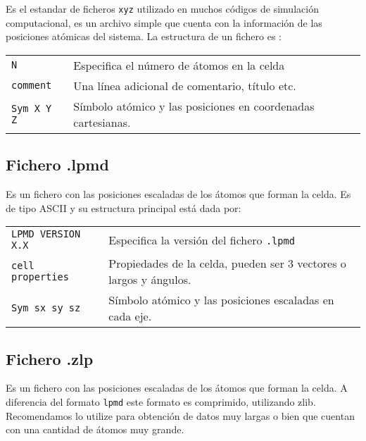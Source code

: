 \documentclass[a4paper,10pt]{scrbook}
\begin{document}
Es el estandar de ficheros \verb|xyz| utilizado en muchos c\'odigos de simulaci\'on computacional, es un archivo simple que cuenta con la informaci\'on de las posiciones at\'omicas del sistema. La estructura de un fichero es :
\begin{center}
\begin{tabular}{l|l}
 \verb|N| & Especifica el n\'umero de \'atomos en la celda \\
 \verb|comment| & Una l\'inea adicional de comentario, t\'itulo etc. \\
 \verb|Sym X Y Z| & S\'imbolo at\'omico y las posiciones en coordenadas cartesianas. \\
\end{tabular}
\end{center}

\subsection{Fichero .lpmd}

Es un fichero con las posiciones escaladas de los \'atomos que forman la celda. Es de tipo ASCII y su estructura principal est\'a dada por:

\begin{center}
 \begin{tabular}{l|l}
 \verb|LPMD VERSION X.X | & Especifica la versi\'on del fichero \verb|.lpmd| \\
 \verb|cell properties | & Propiedades de la celda, pueden ser 3 vectores o largos y \'angulos. \\
 \verb|Sym sx sy sz| & S\'imbolo at\'omico y las posiciones escaladas en cada eje.\\
\end{tabular}
\end{center}

\subsection{Fichero .zlp}

Es un fichero con las posiciones escaladas de los \'atomos que forman la celda. A diferencia del formato \verb|lpmd| este formato es comprimido, utilizando zlib. Recomendamos lo utilize para obtenci\'on de datos muy largas o bien que cuentan con una cantidad de \'atomos muy grande.
\end{document}
